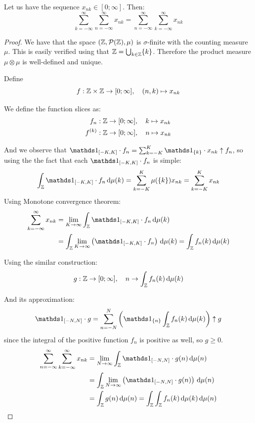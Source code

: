 \begin{theorem} \label{thm:discrete tonelli}
    Let us have the sequence $x_{nk} \in [0;\infty]$. Then:
    \[
        \sum_{k=-\infty}^{\infty} \sum_{n=-\infty}^{\infty} x_{nk}
        = \sum_{n=-\infty}^{\infty} \sum_{k=-\infty}^{\infty} x_{nk}\]
\end{theorem}
\begin{proof}
    We have that the space $(\mathbb{Z}, \mathcal{P}(\mathbb{Z}), \mu)$ is $\sigma$-finite with the counting measure $\mu$. This is easily verified using that $\mathbb{Z} = \bigcup_{k \in \mathbb{Z}} \{k\}$. Therefore the product measure $\mu \otimes \mu$ is well-defined and unique.

    Define
    \[
        f:\mathbb{Z} \times \mathbb{Z} \to [0;\infty], \quad (n, k) \mapsto x_{nk}\]

    We define the function slices as:
    \begin{align*}
        f_n: \mathbb{Z} \to [0;\infty]     & , \quad k \mapsto x_{nk} \\
        f^{(k)}: \mathbb{Z} \to [0;\infty] & , \quad n \mapsto x_{nk}
    \end{align*}

    And we observe that $\ind_{[-K, K]} \cdot f_{n} = \sum_{k=-K}^{K} \ind_{\{k\}} \cdot x_{nk} \uparrow f_n$, so using the the fact that each $\ind_{[-K, K]} \cdot f_{n}$ is simple:
    \[\int_{\Z} \ind_{[-K, K]} \cdot f_{n} \dx{\mu(k)}
        = \sum_{k=-K}^{K} \mu(\{k\}) x_{nk}
        = \sum_{k=-K}^{K} x_{nk} \]
    Using Monotone convergence theorem:
    \begin{align*}
        \sum_{k=-\infty}^{\infty} x_{nk}
         & = \lim_{K \to \infty} \int_{\Z} \ind_{[-K, K]} \cdot f_{n} \dx{\mu(k)}
        \\ &= \int_{\Z} \lim_{K \to \infty} \left( \ind_{[-K, K]} \cdot f_{n} \right) \dx{\mu(k)}
        = \int_{\Z} f_{n}(k) \dx{\mu(k)}
    \end{align*}

    Using the similar construction:
    \[g:\mathbb{Z} \to [0;\infty], \quad n \to \int_{\mathbb{Z}} f_{n}(k) \, \mathrm{d}\mu(k)\]

    And its approximation:
    \[\ind_{[-N, N]} \cdot g
        = \sum_{n=-N}^{N} \left(\ind_{\{n\}}\int_{\Z} f_{n}(k) \dx{\mu(k)}\right) \uparrow g\]
    since the integral of the positive function $f_n$ is positive as well, so $g \geq 0$.
    \begin{align*}
        \sum_{n=-\infty}^{\infty} \sum_{k=-\infty}^{\infty} x_{nk}
         & = \lim_{N \to \infty} \int_{\Z} \ind_{[-N, N]} \cdot g(n) \dx{\mu(n)}
        \\ &= \int_{\Z} \lim_{N \to \infty} \left( \ind_{[-N, N]} \cdot g(n) \right) \dx{\mu(n)}
        \\ &= \int_{\Z} g(n) \dx{\mu(n)}
        = \int_{\Z} \int_{\Z} f_{n}(k) \dx{\mu(k)} \dx{\mu(n)}
    \end{align*}


\end{proof}

